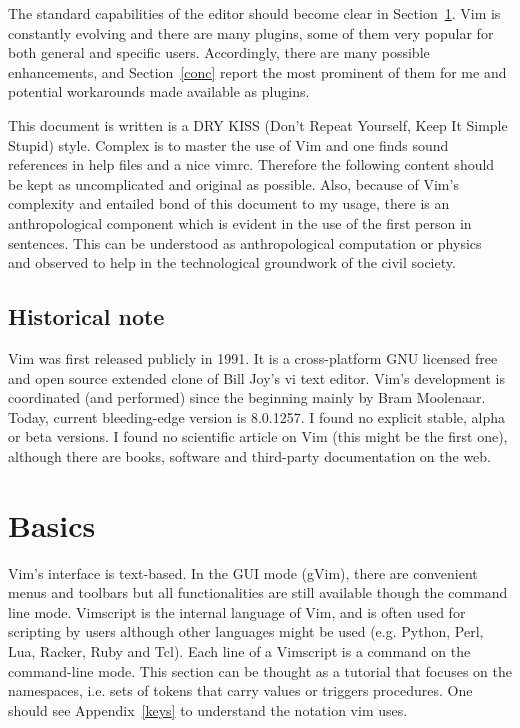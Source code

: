 \documentclass{article}
\begin{document}
The standard capabilities of the editor
should become clear in Section~\ref{basics}.
Vim is constantly evolving and there are many plugins,
some of them very popular for both general and specific
users.
Accordingly, there are many possible enhancements,
and Section~\ref{conc} report the most prominent of them
for me and potential workarounds made available as plugins.

This document is written is a DRY KISS
(Don't Repeat Yourself, Keep It Simple Stupid) style.
Complex is to master the use of Vim
and one finds sound
references in help files and a nice vimrc.
Therefore the following content should be kept
as uncomplicated and original as possible.
Also, because of Vim's complexity and entailed
bond of this document to my usage,
there is an anthropological component
which is evident in the use of the first person
in sentences.
This can be understood as anthropological computation
or physics~\cite{anPh,anPh2} and observed to help
in the technological groundwork of the civil society.


\subsection{Historical note}
Vim was first released publicly in 1991.
It is a cross-platform GNU licensed free and open source extended clone of Bill Joy's vi text editor.
Vim's development is coordinated (and performed) since the beginning
mainly by Bram Moolenaar.
Today, current bleeding-edge version is 8.0.1257.
I found no explicit stable, alpha or beta versions.
I found no scientific article on Vim 
(this might be the first one), although there are
books, software and third-party documentation on the web.

\section{Basics}\label{basics}
Vim's interface is text-based.
In the GUI mode (gVim),
there are convenient menus and toolbars
but all functionalities are still available though
the command line mode.
Vimscript is the internal language of Vim,
and is often used for scripting by users
although other languages might be used 
(e.g. Python, Perl, Lua, Racker, Ruby and Tcl). 
Each line of a Vimscript is a command on the
command-line mode.
This section can be thought as a tutorial
that focuses on the namespaces, i.e. sets of tokens
that carry values or triggers procedures.
One should see Appendix~\ref{keys}
to understand the notation vim uses.
\end{document}

